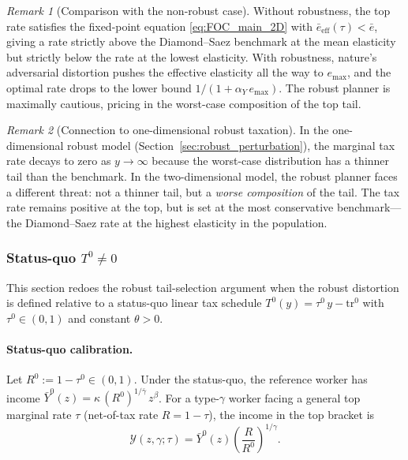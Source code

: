 \documentclass[12pt,a4paper]{article}
\theoremstyle{definition}
\theoremstyle{plain}
\theoremstyle{remark}
\newtheorem{remark}{Remark}[section]
\newcommand{\calY}{\mathcal{Y}}
\begin{document}
\begin{remark}[Comparison with the non-robust case]
\label{rem:robust_vs_nonrobust_2D}
Without robustness, the top rate satisfies the fixed-point equation \eqref{eq:FOC_main_2D} with $\bar{e}_{\mathrm{eff}}(\tau) < \bar{e}$, giving a rate strictly above the Diamond--Saez benchmark at the mean elasticity but strictly below the rate at the lowest elasticity.  With robustness, nature's adversarial distortion pushes the effective elasticity all the way to $e_{\max}$, and the optimal rate drops to the lower bound $1/(1+\alpha_Y\,e_{\max})$.  The robust planner is maximally cautious, pricing in the worst-case composition of the top tail.
\end{remark}

\begin{remark}[Connection to one-dimensional robust taxation]
\label{rem:1D_vs_2D_robust}
In the one-dimensional robust model (Section~\ref{sec:robust_perturbation}), the marginal tax rate decays to zero as $y \to \infty$ because the worst-case distribution has a thinner tail than the benchmark.  In the two-dimensional model, the robust planner faces a different threat: not a thinner tail, but a \emph{worse composition} of the tail.  The tax rate remains positive at the top, but is set at the most conservative benchmark---the Diamond--Saez rate at the highest elasticity in the population.
\end{remark}


\subsubsection{Status-quo $T^0 \neq 0$}
\label{sec:2D_statusquo}

This section redoes the robust tail-selection argument when the robust distortion is defined relative to a status-quo linear tax schedule $T^0(y) = \tau^0\,y - \mathrm{tr}^0$ with $\tau^0 \in (0,1)$ and constant $\theta > 0$.

\paragraph{Status-quo calibration.}

Let $R^0 := 1-\tau^0 \in (0,1)$.  Under the status-quo, the reference worker has income $\bar{Y}^0(z) = \kappa\,(R^0)^{1/\bar\gamma}\,z^{\beta}$.  For a type-$\gamma$ worker facing a general top marginal rate $\tau$ (net-of-tax rate $R = 1-\tau$), the income in the top bracket is
\begin{equation}
\label{eq:Y_statusquo_2D}
  \calY(z,\gamma;\tau) = \bar{Y}^0(z)\left(\frac{R}{R^0}\right)^{1/\gamma}.
\end{equation}
\end{document}
